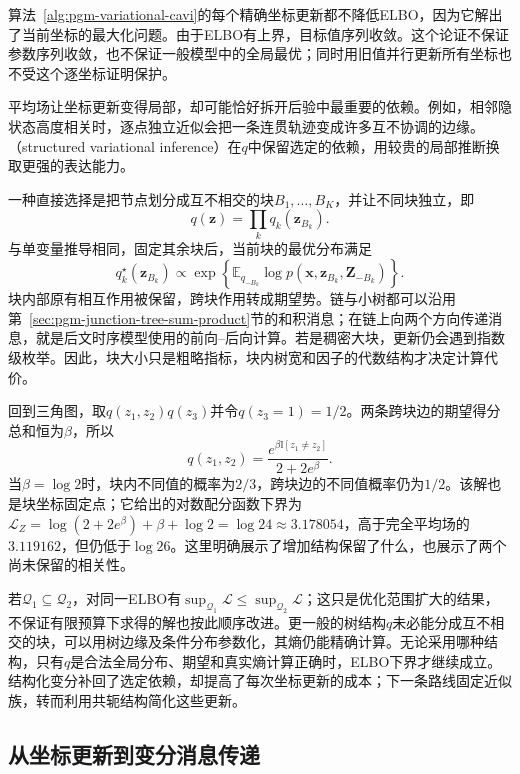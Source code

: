 算法~\ref{alg:pgm-variational-cavi}的每个精确坐标更新都不降低ELBO，因为它解出了当前坐标的最大化问题。由于ELBO有上界，目标值序列收敛。这个论证不保证参数序列收敛，也不保证一般模型中的全局最优；同时用旧值并行更新所有坐标也不受这个逐坐标证明保护。

平均场让坐标更新变得局部，却可能恰好拆开后验中最重要的依赖。例如，相邻隐状态高度相关时，逐点独立近似会把一条连贯轨迹变成许多互不协调的边缘。（structured variational inference）在$q$中保留选定的依赖，用较贵的局部推断换取更强的表达能力。
\label{sec:pgm-variational-structured}

一种直接选择是把节点划分成互不相交的块$B_1,\ldots,B_K$，并让不同块独立，即
\[
  q(\bm z)=\prod_k q_k(\bm z_{B_k}).
\]
与单变量推导相同，固定其余块后，当前块的最优分布满足
\begin{equation}
  q_k^\star(\bm z_{B_k})
     \propto\exp\left\{
       \mathbb E_{q_{-B_k}}\log p(\bm x,\bm z_{B_k},\bm Z_{-B_k})
     \right\}.
  \label{eq:pgm-variational-block}
\end{equation}
块内部原有相互作用被保留，跨块作用转成期望势。链与小树都可以沿用第~\ref{sec:pgm-junction-tree-sum-product}节的和积消息；在链上向两个方向传递消息，就是后文时序模型使用的前向--后向计算。若是稠密大块，更新仍会遇到指数级枚举。因此，块大小只是粗略指标，块内树宽和因子的代数结构才决定计算代价。

回到三角图，取$q(z_1,z_2)q(z_3)$并令$q(z_3=1)=1/2$。两条跨块边的期望得分总和恒为$\beta$，所以
\[
  q(z_1,z_2)=
    \frac{e^{\beta\mathbb I[z_1\ne z_2]}}{2+2e^\beta}.
\]
当$\beta=\log2$时，块内不同值的概率为$2/3$，跨块边的不同值概率仍为$1/2$。该解也是块坐标固定点；它给出的对数配分函数下界为$\mathcal L_Z=\log(2+2e^\beta)+\beta+\log2=\log24\approx3.178054$，高于完全平均场的$3.119162$，但仍低于$\log26$。这里明确展示了增加结构保留了什么，也展示了两个尚未保留的相关性。

若$\mathcal Q_1\subseteq\mathcal Q_2$，对同一ELBO有$\sup_{\mathcal Q_1}\mathcal L\leq\sup_{\mathcal Q_2}\mathcal L$；这只是优化范围扩大的结果，不保证有限预算下求得的解也按此顺序改进。更一般的树结构$q$未必能分成互不相交的块，可以用树边缘及条件分布参数化，其熵仍能精确计算。无论采用哪种结构，只有$q$是合法全局分布、期望和真实熵计算正确时，ELBO下界才继续成立。结构化变分补回了选定依赖，却提高了每次坐标更新的成本；下一条路线固定近似族，转而利用共轭结构简化这些更新。

\subsection{从坐标更新到变分消息传递}
\label{sec:pgm-variational-coordinate-vmp}
\label{sec:pgm-variational-vmp}

